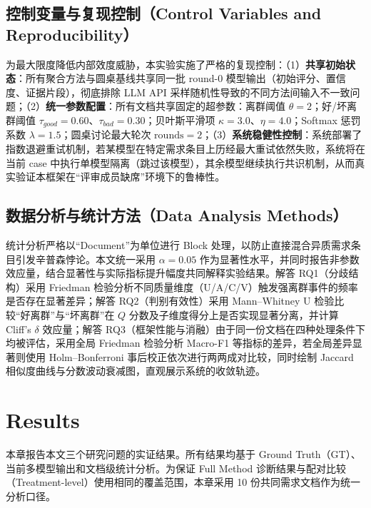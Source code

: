 \documentclass[a4paper,11pt]{ctexart}
\begin{document}
\subsection{控制变量与复现控制（Control Variables and Reproducibility）}
为最大限度降低内部效度威胁，本实验实施了严格的复现控制：（1）\textbf{共享初始状态}：所有聚合方法与圆桌基线共享同一批 round-0 模型输出（初始评分、置信度、证据片段），彻底排除 LLM API 采样随机性导致的不同方法间输入不一致问题；（2）\textbf{统一参数配置}：所有文档共享固定的超参数：离群阈值 $\theta=2$；好/坏离群阈值 $\tau_{good}=0.60$、$\tau_{bad}=0.30$；贝叶斯平滑项 $\kappa=3.0$、$\eta=4.0$；Softmax 惩罚系数 $\lambda=1.5$；圆桌讨论最大轮次 $\mathrm{rounds}=2$；（3）\textbf{系统稳健性控制}：系统部署了指数退避重试机制，若某模型在特定需求条目上历经最大重试依然失败，系统将在当前 case 中执行单模型隔离（跳过该模型），其余模型继续执行共识机制，从而真实验证本框架在“评审成员缺席”环境下的鲁棒性。

\subsection{数据分析与统计方法（Data Analysis Methods）}
\label{sec:analysis}
统计分析严格以“Document”为单位进行 Block 处理，以防止直接混合异质需求条目引发辛普森悖论。本文统一采用 $\alpha=0.05$ 作为显著性水平，并同时报告非参数效应量，结合显著性与实际指标提升幅度共同解释实验结果。解答 RQ1（分歧结构）采用 Friedman 检验分析不同质量维度（U/A/C/V）触发强离群事件的频率是否存在显著差异；解答 RQ2（判别有效性）采用 Mann--Whitney U 检验比较“好离群”与“坏离群”在 $Q$ 分数及子维度得分上是否实现显著分离，并计算 Cliff's $\delta$ 效应量；解答 RQ3（框架性能与消融）由于同一份文档在四种处理条件下均被评估，采用全局 Friedman 检验分析 Macro-F1 等指标的差异，若全局差异显著则使用 Holm--Bonferroni 事后校正依次进行两两成对比较，同时绘制 Jaccard 相似度曲线与分数波动衰减图，直观展示系统的收敛轨迹。

% 

\section{Results}
\label{sec:results}
本章报告本文三个研究问题的实证结果。所有结果均基于 Ground Truth（GT）、当前多模型输出和文档级统计分析。为保证 Full Method 诊断结果与配对比较（Treatment-level）使用相同的覆盖范围，本章采用 10 份共同需求文档作为统一分析口径。
\end{document}
